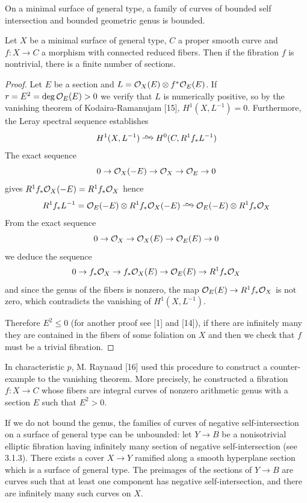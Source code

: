 \documentclass[main.tex]{subfiles}
\begin{document}
\begin{cor}
On a minimal surface of general type, a family of curves of bounded self intersection and bounded geometric genus is bounded.
\end{cor}

\begin{cor}
Let $X$ be a minimal surface of general type, $C$ a proper smooth curve and $f : X \to C$ a morphism with connected reduced fibers. Then if the fibration $f$ is nontrivial, there is a finite number of sections.
\end{cor}

\begin{proof}
Let $E$ be a section and $L = \mathcal{O}_{X}(E) \otimes f^* \mathcal{O}_{E}(E)$. If $r = E^2 = \deg{\mathcal{O}_{E}(E)} > 0$ we verify that $L$ is numerically positive, so by the vanishing theorem of Kodaira-Ramanujam [15], $H^1(X, L^{-1}) = 0$. Furthermore, the Leray spectral sequence establishes
\[ H^1(X, L^{-1}) \iso H^0(C, R^1 f_* L^{-1}) \]
The exact sequence
\[ 0 \to \mathcal{O}_{X}(-E) \to \mathcal{O}_{X} \to \mathcal{O}_{E} \to 0 \]
gives $R^1 f_* \mathcal{O}_{X}(-E) = R^1 f_* \mathcal{O}_{X}$ hence
\[ R^1 f_* L^{-1} = \struct{E}(-E) \ot R^1 f_* \struct{X}(-E) \iso \struct{E}(-E) \ot R^1 f_* \struct{X} \]
From the exact sequence
\[ 0 \to \mathcal{O}_{X} \to \mathcal{O}_{X}(E) \to \mathcal{O}_{E}(E) \to 0 \]
we deduce the sequence
\[ 0 \to f_* \mathcal{O}_{X} \to f_* \mathcal{O}_{X}(E) \to \mathcal{O}_{E}(E) \to R^1 f_* \mathcal{O}_{X} \]
and since the genus of the fibers is nonzero, the map $\mathcal{O}_{E}(E) \to R^1 f_* \mathcal{O}_{X}$ is not zero, which contradicts the vanishing of $H^1(X, L^{-1})$.
\par
Therefore $E^2 \le 0$ (for another proof see [1] and [14]), if there are infinitely many they are contained in the fibers of some foliation on $X$ and then we check that $f$ must be a trivial fibration.
\end{proof}

\begin{rmk}
In characteristic $p$, M. Raynaud [16] used this procedure to construct a counter-example to the vanishing theorem. More precisely, he constructed a fibration $f : X \to C$ whose fibers are integral curves of nonzero arithmetic genus with a section $E$ such that $E^2 > 0$.
\end{rmk}

\begin{rmk}
If we do not bound the genus, the families of curves of negative self-intersection on a surface of general type can be unbounded: let $Y \to B$ be a nonisotrivial elliptic fibration having infinitely many section of negative self-intersection (see 3.1.3). There exists a cover $X \to Y$ ramified along a smooth hyperplane section which is a surface of general type. %
The preimages of the sections of $Y \to B$ are curves such that at least one component has negative self-intersection, and there are infinitely many such curves on $X$.
\end{rmk}
\end{document}
